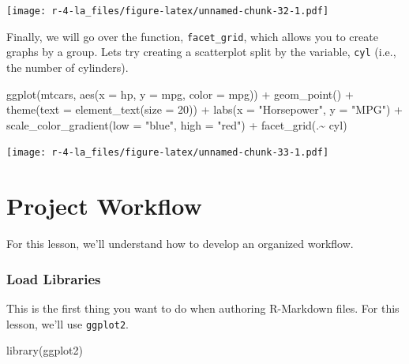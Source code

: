 \documentclass[
]{book}
\newenvironment{Shaded}{\begin{snugshade}}{\end{snugshade}}
\newcommand{\AttributeTok}[1]{\textcolor[rgb]{0.77,0.63,0.00}{#1}}
\newcommand{\DecValTok}[1]{\textcolor[rgb]{0.00,0.00,0.81}{#1}}
\newcommand{\FunctionTok}[1]{\textcolor[rgb]{0.00,0.00,0.00}{#1}}
\newcommand{\NormalTok}[1]{#1}
\newcommand{\SpecialCharTok}[1]{\textcolor[rgb]{0.00,0.00,0.00}{#1}}
\newcommand{\StringTok}[1]{\textcolor[rgb]{0.31,0.60,0.02}{#1}}
\begin{document}
\texttt{[image: r-4-la\_files/figure-latex/unnamed-chunk-32-1.pdf]}

Finally, we will go over the function, \texttt{facet\_grid}, which allows you to create graphs by a group. Lets try creating a scatterplot split by the variable, \texttt{cyl} (i.e., the number of cylinders).

\begin{Shaded}
\begin{Highlighting}[]
\FunctionTok{ggplot}\NormalTok{(mtcars, }\FunctionTok{aes}\NormalTok{(}\AttributeTok{x =}\NormalTok{ hp, }\AttributeTok{y =}\NormalTok{ mpg, }\AttributeTok{color =}\NormalTok{ mpg)) }\SpecialCharTok{+} 
      \FunctionTok{geom\_point}\NormalTok{() }\SpecialCharTok{+} 
      \FunctionTok{theme}\NormalTok{(}\AttributeTok{text =} \FunctionTok{element\_text}\NormalTok{(}\AttributeTok{size =} \DecValTok{20}\NormalTok{)) }\SpecialCharTok{+} 
      \FunctionTok{labs}\NormalTok{(}\AttributeTok{x =} \StringTok{"Horsepower"}\NormalTok{, }\AttributeTok{y =} \StringTok{"MPG"}\NormalTok{) }\SpecialCharTok{+} 
      \FunctionTok{scale\_color\_gradient}\NormalTok{(}\AttributeTok{low =} \StringTok{"blue"}\NormalTok{, }\AttributeTok{high =} \StringTok{"red"}\NormalTok{) }\SpecialCharTok{+} 
      \FunctionTok{facet\_grid}\NormalTok{(.}\SpecialCharTok{\textasciitilde{}}\NormalTok{ cyl)}
\end{Highlighting}
\end{Shaded}

\texttt{[image: r-4-la\_files/figure-latex/unnamed-chunk-33-1.pdf]}

\hypertarget{project-workflow}{%
\chapter{Project Workflow}\label{project-workflow}}

For this lesson, we'll understand how to develop an organized workflow.

\hypertarget{load-libraries}{%
\subsection{Load Libraries}\label{load-libraries}}

This is the first thing you want to do when authoring R-Markdown files. For this lesson, we'll use \texttt{ggplot2}.

\begin{Shaded}
\begin{Highlighting}[]
\FunctionTok{library}\NormalTok{(ggplot2)}
\end{Highlighting}
\end{Shaded}
\end{document}
